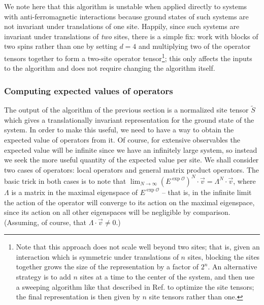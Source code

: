 \documentclass[12pt]{amsbook}
\theoremstyle{plain}
\theoremstyle{definition}
\theoremstyle{remark}
\newcommand{\paren}[1]{\left(#1\right)}
\newcommand{\mexp}[1]{\exp{\mathcal{#1}}}
\begin{document}
We note here that this algorithm is unstable when applied directly to systems with anti-ferromagnetic interactions because ground states of such systems are not invariant under translations of one site.  Happily, since such systems are invariant under translations of \emph{two} sites, there is a simple fix:  work with blocks of two spins rather than one by setting $d=4$ and multiplying two of the operator tensors together to form a two-site operator tensor\footnote{Note that this approach does not scale well beyond two sites;  that is, given an interaction which is symmetric under translations of $n$ sites, blocking the sites together grows the size of the representation by a factor of $2^n$.  An alternative strategy is to add $n$ sites at a time to the center of the system, and then use a sweeping algorithm like that described in Ref. \cite{cond-mat/0404706} to optimize the site tensors;  the final representation is then given by $n$ site tensors rather than one.};  this only affects the inputs to the algorithm and does not require changing the algorithm itself.
\subsubsection{Computing expected values of operators}
\label{exp-algorithm}

The output of the algorithm of the previous section is a normalized site tensor $\tilde S$ which gives a translationally invariant representation for the ground state of the system.  In order to make this useful, we need to have a way to obtain the expected value of operators from it.  Of course, for extensive observables the expected value will be infinite since we have an infinitely large system, so instead we seek the more useful quantity of the expected value per site.  We shall consider two cases of operators:  local operators and general matrix product operators.  The basic trick in both cases is to note that $\lim_{N\to\infty}\paren{E^{\mexp{O}}}^N \cdot \vec{v} = \Lambda^N \cdot \vec{v}$, where $\Lambda$ is a matrix in the maximal eigenspace of $E^{\mexp{O}}$ -- that is, in the infinite limit the action of the operator will converge to its action on the maximal eigenspace, since its action on all other eigenspaces will be negligible by comparison.  (Assuming, of course, that  $\Lambda \cdot \vec{v} \ne 0$.)
\end{document}
